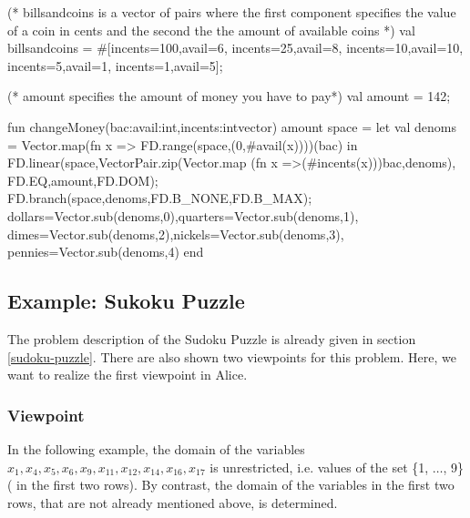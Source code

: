 \documentclass[a4paper,halfparskip]{scrartcl}
\begin{document}
\begin{myverbatim}
(* billsandcoins is a vector of pairs where the first component
   specifies the value of a coin in cents and the second the
   the amount of available coins *)
   val billsandcoins = #[{incents=100,avail=6},
                         {incents=25,avail=8},
                         {incents=10,avail=10},
                         {incents=5,avail=1},
                         {incents=1,avail=5}];
                         
(* amount specifies the amount of money you have to pay*)
   val amount = 142;


fun changeMoney(bac:{avail:int,incents:int}vector) amount space =
    let
       val denoms = Vector.map(fn x => 
                     FD.range(space,(0,#avail(x))))(bac)      
    in
       FD.linear(space,VectorPair.zip(Vector.map
                              (fn x =>(#incents(x)))bac,denoms),
                       FD.EQ,amount,FD.DOM);
       FD.branch(space,denoms,FD.B_NONE,FD.B_MAX);
      {dollars=Vector.sub(denoms,0),quarters=Vector.sub(denoms,1),
       dimes=Vector.sub(denoms,2),nickels=Vector.sub(denoms,3),
       pennies=Vector.sub(denoms,4)}
    end  
\end{myverbatim}


\newpage
\subsection{Example: Sukoku Puzzle}
\label{sudoku-puzzle2}
The problem description of the Sudoku Puzzle is already given
in section \ref{sudoku-puzzle}. There are also shown two viewpoints
for this problem. Here, we want to realize the first viewpoint in
Alice. 

\subsubsection{Viewpoint}

In the following example, the domain
of the variables $x_1, x_4, x_5, x_6, x_9, x_{11}, 
x_{12}, x_{14}, x_{16}, x_{17}$ is unrestricted, i.e. 
values of the set \{1, $\ldots$, 9\} ( in
the first two rows).
By contrast, the domain of the variables in the first two rows,
that are not already mentioned above, is determined.
\end{document}
